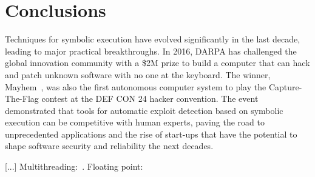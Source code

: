 
\section{Conclusions}
\label{se:conclusions}

Techniques for symbolic execution have evolved significantly in the last decade, leading to major practical breakthroughs. In 2016, DARPA has challenged the global innovation community with a \$2M prize to build a computer that can hack and patch unknown software with no one at the keyboard. The winner, {\sc Mayhem}~\cite{MAYHEM-SP12}, was also the first autonomous computer system to play the Capture-The-Flag contest at the DEF CON 24 hacker convention. The event demonstrated that tools for automatic exploit detection based on symbolic execution can be competitive with human experts, paving the road to unprecedented applications and the rise of start-ups that have the potential to shape software security and reliability the next decades. 

[...] Multithreading:~\cite{KPV-TACAS03,SA-HVC06,CLOUD9-EUROSYS11,FHR-ESEC13,BGC-OOPSLA14,GKW-ESEC15}. Floating point:~\cite{M-STVR01,BGM-STVR06,LTH-ICTSS10,CCK-EUROSYS11,BVL-POPL13,CCK-TSE14,RPW-SIGSOFT15}\\



